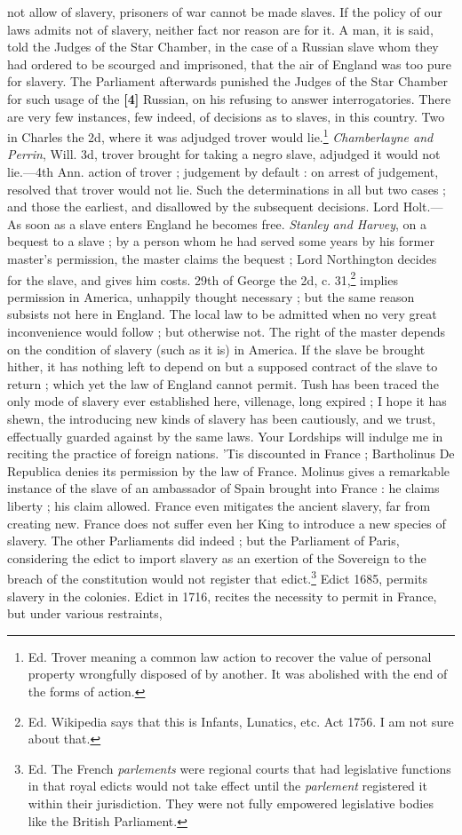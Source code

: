 \documentclass[a4paper]{article}
\begin{document}
not allow of slavery, prisoners of war cannot be made slaves. If the policy of our laws admits not of slavery, neither fact nor reason are for it. A man, it is said, told the Judges of the Star Chamber, in the case of a Russian slave whom they had ordered to be scourged and imprisoned, that the air of England was too pure for slavery. The Parliament afterwards punished the Judges of the Star Chamber for such usage of the \textbf{[4]} Russian, on his refusing to answer interrogatories. There are very few instances, few indeed, of decisions as to slaves, in this country. Two in Charles the 2d, where it was adjudged trover would lie.\footnote{Ed. Trover meaning a common law action to recover the value of personal property wrongfully disposed of by another. It was abolished with the end of the forms of action.} \emph{Chamberlayne and Perrin}, Will. 3d, trover brought for taking a negro slave, adjudged it would not lie.---4th Ann. action of trover ; judgement by default : on arrest of judgement, resolved that trover would not lie. Such the determinations in all but two cases ; and those the earliest, and disallowed by the subsequent decisions. Lord Holt.---As soon as a slave enters England he becomes free. \emph{Stanley and Harvey}, on a bequest to a slave ; by a person whom he had served some years by his former master's permission, the master claims the bequest ; Lord Northington decides for the slave, and gives him costs. 29th of George the 2d, c. 31,\footnote{Ed. Wikipedia says that this is Infants, Lunatics, etc. Act 1756. I am not sure about that.} implies permission in America, unhappily thought necessary ; but the same reason subsists not here in England. The local law to be admitted when no very great inconvenience would follow ; but otherwise not. The right of the master depends on the condition of slavery (such as it is) in America. If the slave be brought hither, it has nothing left to depend on but a supposed contract of the slave to return ; which yet the law of England cannot permit. Tush has been traced the only mode of slavery ever established here, villenage, long expired ; I hope it has shewn, the introducing new kinds of slavery has been cautiously, and we trust, effectually guarded against by the same laws. Your Lordships will indulge me in reciting the practice of foreign nations. 'Tis discounted in France ; Bartholinus De Republica denies its permission by the law of France. Molinus gives a remarkable instance of the slave of an ambassador of Spain brought into France : he claims liberty ; his claim allowed. France even mitigates the ancient slavery, far from creating new. France does not suffer even her King to introduce a new species of slavery. The other Parliaments did indeed ; but the Parliament of Paris, considering the edict to import slavery as an exertion of the Sovereign to the breach of the constitution would not register that edict.\footnote{Ed. The French \emph{parlements} were regional courts that had legislative functions in that royal edicts would not take effect until the \emph{parlement} registered it within their jurisdiction. They were not fully empowered legislative bodies like the British Parliament.} Edict 1685, permits slavery in the colonies. Edict in 1716, recites the necessity to permit in France, but under various restraints, 
\end{document}
